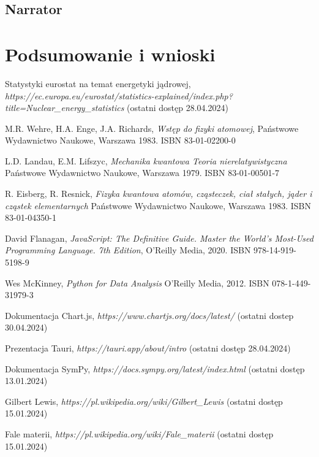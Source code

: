 \documentclass{SGGW-thesis}
\begin{document}
	\section{Narrator}
	
\chapter{Podsumowanie i wnioski}


\begin{thebibliography}{9}
	Statystyki eurostat na temat energetyki jądrowej, 
	\textit{https://ec.europa.eu/eurostat/statistics-explained/index.php?title=Nuclear\_energy\_statistics}
	(ostatni dostęp 28.04.2024)

	M.R. Wehre, H.A. Enge, J.A. Richards,
	\textit{Wstęp do fizyki atomowej}, 
	Państwowe Wydawnictwo Naukowe, Warszawa 1983. ISBN 83-01-02200-0
	
	L.D. Landau, E.M. Lifszyc,
	\textit{Mechanika kwantowa Teoria nierelatywistyczna}
	Państwowe Wydawnictwo Naukowe, Warszawa 1979. ISBN 83-01-00501-7
	
	R. Eisberg, R. Resnick,
	\textit{Fizyka kwantowa atomów, cząsteczek, ciał stałych, jąder i cząstek elementarnych}
	Państwowe Wydawnictwo Naukowe, Warszawa 1983. ISBN 83-01-04350-1

	David Flanagan, 
	\textit{JavaScript: The Definitive Guide. Master the World's Most-Used Programming Language. 7th Edition}, 
	O'Reilly Media, 2020. ISBN 978-14-919-5198-9
	
	Wes McKinney, 
	\textit{Python for Data Analysis}
	O'Reilly Media, 2012. ISBN 078-1-449-31979-3
	
	Dokumentacja Chart.js, 
	\textit{https://www.chartjs.org/docs/latest/}
	(ostatni dostep 30.04.2024)
	
	Prezentacja Tauri, 
	\textit{https://tauri.app/about/intro}
	(ostatni dostęp 28.04.2024)
	
	Dokumentacja SymPy, 
	\textit{https://docs.sympy.org/latest/index.html}
	(ostatni dostęp 13.01.2024)
	
	Gilbert Lewis, 
	\textit{https://pl.wikipedia.org/wiki/Gilbert\_Lewis}
	(ostatni dostęp 15.01.2024)
	
	Fale materii, 
	\textit{https://pl.wikipedia.org/wiki/Fale\_materii}
	(ostatni dostęp 15.01.2024)
	

\end{thebibliography}
\end{document}
